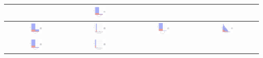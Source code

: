 \begin{table}[!htb]
\begin{center}
\begin{tabular}{ |c|c|c|c| }
         & \includegraphics[width=0.21\textwidth]{NOTEBOOK/IMAGENES_BIRCH_DESCRIPTIVAS/8} 
         \\  \hline 
         \includegraphics[width=0.21\textwidth]{NOTEBOOK/IMAGENES_BIRCH_DESCRIPTIVAS/9} 
         & \includegraphics[width=0.21\textwidth]{NOTEBOOK/IMAGENES_BIRCH_DESCRIPTIVAS/10} 
         & \includegraphics[width=0.21\textwidth]{NOTEBOOK/IMAGENES_BIRCH_DESCRIPTIVAS/11} 
         & \includegraphics[width=0.21\textwidth]{NOTEBOOK/IMAGENES_BIRCH_DESCRIPTIVAS/12} 
         \\  \hline 
         \includegraphics[width=0.21\textwidth]{NOTEBOOK/IMAGENES_BIRCH_DESCRIPTIVAS/13} 
         & \includegraphics[width=0.21\textwidth]{NOTEBOOK/IMAGENES_BIRCH_DESCRIPTIVAS/14} 

\end{tabular}
\end{center}
\end{table}
